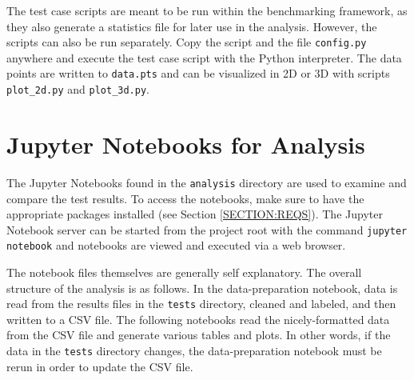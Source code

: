 The test case scripts are meant to be run within the benchmarking framework, as they also generate a statistics file for later use in the analysis. However, the scripts can also be run separately. Copy the script and the file \texttt{config.py} anywhere and execute the test case script with the Python interpreter. The data points are written to \texttt{data.pts} and can be visualized in 2D or 3D with scripts \texttt{plot\_2d.py} and \texttt{plot\_3d.py}.

\section{Jupyter Notebooks for Analysis}
\label{SECTION:NOTEBOOKS}

The Jupyter Notebooks found in the \texttt{analysis} directory are used to examine and compare the test results. To access the notebooks, make sure to have the appropriate packages installed (see Section \ref{SECTION:REQS}). The Jupyter Notebook server can be started from the project root with the command \texttt{jupyter notebook} and notebooks are viewed and executed via a web browser.

The notebook files themselves are generally self explanatory. The overall structure of the analysis is as follows. In the data-preparation notebook, data is read from the results files in the \texttt{tests} directory, cleaned and labeled, and then written to a CSV file. The following notebooks read the nicely-formatted data from the CSV file and generate various tables and plots. In other words, if the data in the \texttt{tests} directory changes, the data-preparation notebook must be rerun in order to update the CSV file.
